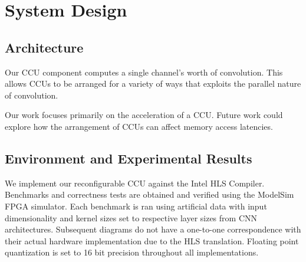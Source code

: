 \chapter{System Design}
\section{Architecture}
Our CCU component computes a single channel's worth of convolution. This allows CCUs to be arranged for a variety of ways that exploits the parallel nature of convolution.


Our work focuses primarily on the acceleration of a CCU. Future work could explore how the arrangement of CCUs can affect memory access latencies.

\section{Environment and Experimental Results}
We implement our reconfigurable CCU against the Intel HLS Compiler. Benchmarks and correctness tests are obtained and verified using the ModelSim FPGA simulator. Each benchmark is ran using artificial data with input dimensionality and kernel sizes set to respective layer sizes from CNN architectures. Subsequent diagrams do not have a one-to-one correspondence with their actual hardware implementation due to the HLS translation. Floating point quantization is set to 16 bit precision throughout all implementations.


